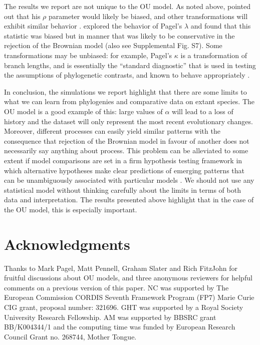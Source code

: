 \documentclass[a4paper,12pt]{article}
\begin{document}
The results we report are not unique to the OU model. As noted above, \citet{grafen1989phylogenetic} pointed out that his $\rho$ parameter would likely be biased, and other transformations \citep[e.g., $\lambda$, $\delta$, ACDC;][]{Pagel:1997aa,Pagel:1999aa,Blomberg:2003aa} will exhibit similar behavior \citep[e.g., see][]{freckleton2002phylogenetic}. \citet{freckleton2002phylogenetic} explored the behavior of Pagel’s $\lambda$ and found that this statistic was biased but in manner that was likely to be conservative in the rejection of the Brownian model (also see Supplemental Fig. S7). Some transformations may be unbiased: for example, Pagel’s $\kappa$ is a transformation of branch lengths, and is essentially the “standard diagnostic” that is used in testing the assumptions of phylogenetic contrasts, and known to behave appropriately \citep[Supplemental Fig. S6;][]{garland1992procedures}.
  
In conclusion, the simulations we report highlight that there are some limits to what we can learn from phylogenies and comparative data on extant species. The OU model is a good example of this: large values of $\alpha$ will lead to a loss of history and the dataset will only represent the most recent evolutionary changes. Moreover, different processes can easily yield similar patterns \citep[e.g.,][]{Revell:2008ab} with the consequence that rejection of the Brownian model in favour of another does not necessarily say anything about process. This problem can be alleviated to some extent if model comparisons are set in a firm hypothesis testing framework in which alternative hypotheses make clear predictions of emerging patterns that can be unambiguously associated with particular models \citep[e.g.,][]{Cooper:2011aa}. We should not use any statistical model without thinking carefully about the limits in terms of both data and interpretation. The results presented above highlight that in the case of the OU model, this is especially important. 

\section{Acknowledgments}
Thanks to Mark Pagel, Matt Pennell, Graham Slater and Rich FitzJohn for fruitful discussions about OU models, and three anonymous reviewers for helpful comments on a previous version of this paper. NC was supported by The European Commission CORDIS Seventh Framework Program (FP7) Marie Curie CIG grant, proposal number: 321696. GHT was supported by a Royal Society University Research Fellowship. AM was supported by BBSRC grant BB/K004344/1 and the computing time was funded by European Research Council Grant no. 268744, Mother Tongue.
\end{document}
